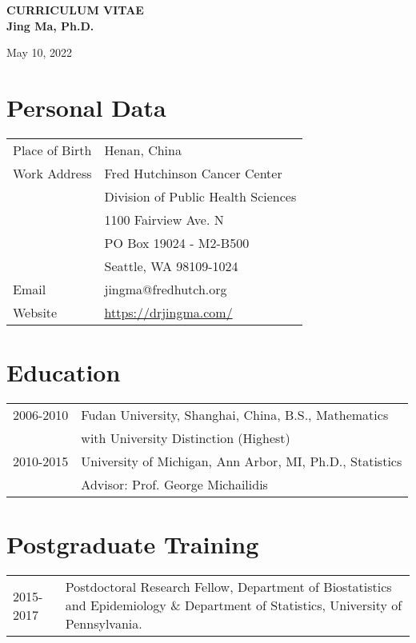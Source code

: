 \documentclass[10pt]{article}
\begin{document}
 

\begin{center}
{\large\bf 
CURRICULUM VITAE\\
Jing Ma, Ph.D.\\
}

May 10, 2022 

\vspace{1em}

\end{center} 

\section{Personal Data}

\begin{table}[H]
\hskip0.4cm\begin{tabular}{p{2cm}p{12.5cm}}
Place of Birth & Henan, China                           \\
{Work Address}   & Fred Hutchinson Cancer Center \\
& Division of Public Health Sciences\\
& 1100 Fairview Ave. N\\
& PO Box 19024 - M2-B500 \\
& Seattle, WA 98109-1024 \\
Email          & jingma@fredhutch.org \\
Website        & \url{https://drjingma.com/}                          
\end{tabular}
\end{table}


\section{Education}

\begin{table}[H]
\hskip0.9cm\begin{tabular}{p{1.6cm}p{12.5cm}}
2006-2010 & Fudan University, Shanghai, China, B.S., Mathematics \\
& with University Distinction (Highest)\\
2010-2015 & University of Michigan, Ann Arbor, MI, Ph.D., Statistics \\
& {Advisor}: Prof. George Michailidis
\end{tabular}
\end{table}

\section{Postgraduate Training} 
\begin{table}[H]
\hskip0.9cm\begin{tabular}{p{1.6cm}p{12cm}}
2015-2017 & Postdoctoral Research Fellow, {Department of Biostatistics and Epidemiology} \& {Department of Statistics}, University of Pennsylvania. %
\end{tabular}
\end{table}
\end{document}
